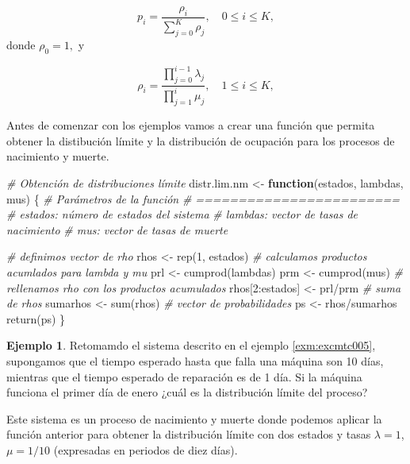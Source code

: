 \documentclass[
]{book}
\newenvironment{Shaded}{\begin{snugshade}}{\end{snugshade}}
\newcommand{\CommentTok}[1]{\textcolor[rgb]{0.56,0.35,0.01}{\textit{#1}}}
\newcommand{\ControlFlowTok}[1]{\textcolor[rgb]{0.13,0.29,0.53}{\textbf{#1}}}
\newcommand{\DecValTok}[1]{\textcolor[rgb]{0.00,0.00,0.81}{#1}}
\newcommand{\FunctionTok}[1]{\textcolor[rgb]{0.00,0.00,0.00}{#1}}
\newcommand{\NormalTok}[1]{#1}
\newcommand{\OtherTok}[1]{\textcolor[rgb]{0.56,0.35,0.01}{#1}}
\newcommand{\SpecialCharTok}[1]{\textcolor[rgb]{0.00,0.00,0.00}{#1}}
\theoremstyle{definition}
\theoremstyle{definition}
\newtheorem{example}{Ejemplo}[chapter]
\theoremstyle{definition}
\theoremstyle{definition}
\theoremstyle{remark}
\begin{document}
\[p_i = \frac{\rho_i}{\sum_{j = 0}^K \rho_j}, \quad 0 \leq i \leq K,\]
donde \(\rho_0 = 1,\) y

\[\rho_i = \frac{\prod_{j=0}^{i-1}\lambda_j}{\prod_{j=1}^{i}\mu_j}, \quad 1 \leq i \leq K,\]

Antes de comenzar con los ejemplos vamos a crear una función que permita obtener la distibución límite y la distribución de ocupación para los procesos de nacimiento y muerte.

\begin{Shaded}
\begin{Highlighting}[]
\CommentTok{\# Obtención de distribuciones límite }
\NormalTok{distr.lim.nm }\OtherTok{\textless{}{-}} \ControlFlowTok{function}\NormalTok{(estados, lambdas, mus)}
\NormalTok{\{}
  \CommentTok{\# Parámetros de la función}
  \CommentTok{\# ========================}
  \CommentTok{\# estados: número de estados del sistema}
  \CommentTok{\# lambdas: vector de tasas de nacimiento}
  \CommentTok{\# mus: vector de tasas de muerte}
  
  \CommentTok{\# definimos vector de rho}
\NormalTok{  rhos }\OtherTok{\textless{}{-}} \FunctionTok{rep}\NormalTok{(}\DecValTok{1}\NormalTok{, estados)}
  \CommentTok{\# calculamos productos acumlados para lambda y mu}
\NormalTok{  prl }\OtherTok{\textless{}{-}} \FunctionTok{cumprod}\NormalTok{(lambdas)}
\NormalTok{  prm }\OtherTok{\textless{}{-}} \FunctionTok{cumprod}\NormalTok{(mus)}
  \CommentTok{\# rellenamos rho con los productos acumulados}
\NormalTok{  rhos[}\DecValTok{2}\SpecialCharTok{:}\NormalTok{estados] }\OtherTok{\textless{}{-}}\NormalTok{ prl}\SpecialCharTok{/}\NormalTok{prm}
  \CommentTok{\# suma de rhos}
\NormalTok{  sumarhos }\OtherTok{\textless{}{-}} \FunctionTok{sum}\NormalTok{(rhos)}
  \CommentTok{\# vector de probabilidades}
\NormalTok{  ps }\OtherTok{\textless{}{-}}\NormalTok{ rhos}\SpecialCharTok{/}\NormalTok{sumarhos}
  \FunctionTok{return}\NormalTok{(ps)}
\NormalTok{\}}
\end{Highlighting}
\end{Shaded}

\begin{example}
Retomamdo el sistema descrito en el ejemplo \ref{exm:excmtc005}, supongamos que el tiempo esperado hasta que falla una máquina son 10 días, mientras que el tiempo esperado de reparación es de 1 día. Si la máquina funciona el primer día de enero ¿cuál es la distribución límite del proceso?

Este sistema es un proceso de nacimiento y muerte donde podemos aplicar la función anterior para obtener la distribución límite con dos estados y tasas \(\lambda = 1\), \(\mu = 1/10\) (expresadas en periodos de diez días).
\end{example}
\end{document}
